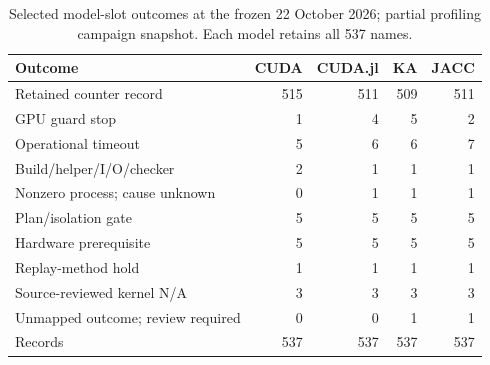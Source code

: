 \begin{table}[t]
\centering\small
\caption{Selected model-slot outcomes at the frozen 22 October 2026; partial profiling campaign snapshot. Each model retains all 537 names.}
\label{tab:roofline-failures-selected}
\begin{tabular}{lrrrr}
\toprule
Outcome & CUDA & CUDA.jl & KA & JACC \\
\midrule
Retained counter record & 515 & 511 & 509 & 511 \\
GPU guard stop & 1 & 4 & 5 & 2 \\
Operational timeout & 5 & 6 & 6 & 7 \\
Build/helper/I/O/checker & 2 & 1 & 1 & 1 \\
Nonzero process; cause unknown & 0 & 1 & 1 & 1 \\
Plan/isolation gate & 5 & 5 & 5 & 5 \\
Hardware prerequisite & 5 & 5 & 5 & 5 \\
Replay-method hold & 1 & 1 & 1 & 1 \\
Source-reviewed kernel N/A & 3 & 3 & 3 & 3 \\
Unmapped outcome; review required & 0 & 0 & 1 & 1 \\
\midrule
Records & 537 & 537 & 537 & 537 \\
\bottomrule
\end{tabular}
\end{table}
